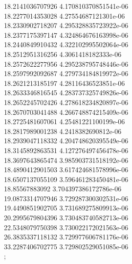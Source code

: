 {18.2141036707926 4.170810370851541e-06
 \\
18.2277014353028 4.27554687121301e-06
 \\
18.2330902718207 4.295328835723922e-06
 \\
18.2377175397147 4.324864676163998e-06
 \\
18.2440849910432 4.322102995502064e-06
 \\
18.2512951316256 4.3061418182333e-06
 \\
18.2572622277956 4.295238795748446e-06
 \\
18.2597992092687 4.279734184819972e-06
 \\
18.2621213185197 4.28116436523851e-06
 \\
18.2633346816545 4.283737325749826e-06
 \\
18.2652245702426 4.278618234820897e-06
 \\
18.2670703041488 4.266748874215409e-06
 \\
18.2725481607061 4.25481221100199e-06
 \\
18.2817989001238 4.2418382690812e-06
 \\
18.2939047118332 4.204748620395549e-06
 \\
18.3145892863531 4.127276497456478e-06
 \\
18.3697643865474 3.985903731518192e-06
 \\
18.4890412901503 3.617424681578996e-06
 \\
18.6507137055109 3.596461283450481e-06
 \\
18.85567883092 3.704397386172786e-06
 \\
19.0873314707946 3.729287300302531e-06
 \\
19.4490851902705 3.731689275809913e-06
 \\
20.2995679804396 3.730483740582713e-06
 \\
22.5348079750398 3.730022172021563e-06
 \\
26.3835337118132 3.729977606781176e-06
 \\
33.2287406702775 3.729802529051085e-06
 \\
};
